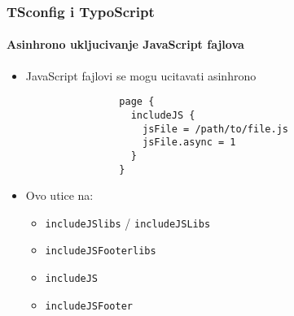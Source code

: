 
\begin{frame}[fragile]
	\frametitle{TSconfig i TypoScript}
	\framesubtitle{Asinhrono ukljucivanje JavaScript fajlova}

	\begin{itemize}
		\item JavaScript fajlovi se mogu ucitavati asinhrono

			\begin{lstlisting}
				page {
				  includeJS {
				    jsFile = /path/to/file.js
				    jsFile.async = 1
				  }
				}
			\end{lstlisting}

		\item Ovo utice na:

			\begin{itemize}
				\item \texttt{includeJSlibs} / \texttt{includeJSLibs}
				\item \texttt{includeJSFooterlibs}
				\item \texttt{includeJS}
				\item \texttt{includeJSFooter}
			\end{itemize}

	\end{itemize}

\end{frame}



